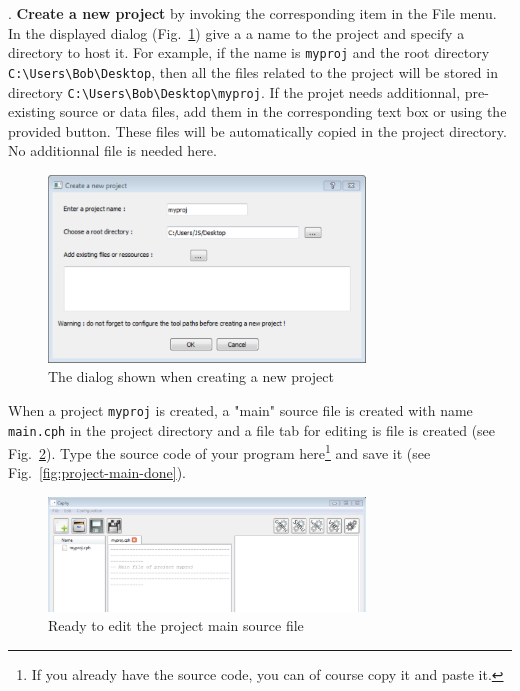 \medskip
\step. \textbf{Create a new project} by invoking the corresponding item in the \textsf{File}
menu. In the displayed dialog (Fig.~\ref{fig:create-project}) give a a name to the project and
specify a directory to host it. For example, if the name is \texttt{myproj} and the root directory
\verb|C:\Users\Bob\Desktop|, then all the files related to the project will be stored in
directory \verb|C:\Users\Bob\Desktop\myproj|. If the projet needs additionnal, pre-existing
source or data files, add them in the corresponding text box or using the provided button. These
files will be automatically copied in the project directory. No additionnal file is needed here.

\begin{figure}[h]
  \centering
\includegraphics[width=0.75\textwidth]{figs/ide/create-project}
  \caption{The dialog shown when creating a new project}
  \label{fig:create-project}
\end{figure}

\step When a project \texttt{myproj} is created, a "main" source file is created with name
\texttt{main.cph} in the project directory and a file tab for editing is file is created (see
Fig.~\ref{fig:project-main}). Type the \caph source code of your program here\footnote{If you
  already have the source code, you can of course copy it and paste it.} and save it (see
Fig.~\ref{fig:project-main-done}). 

\begin{figure}[h]
  \centering
  \includegraphics[width=0.75\textwidth]{figs/ide/project-main}
  \caption{Ready to edit the project main source file}
  \label{fig:project-main}
\end{figure}

